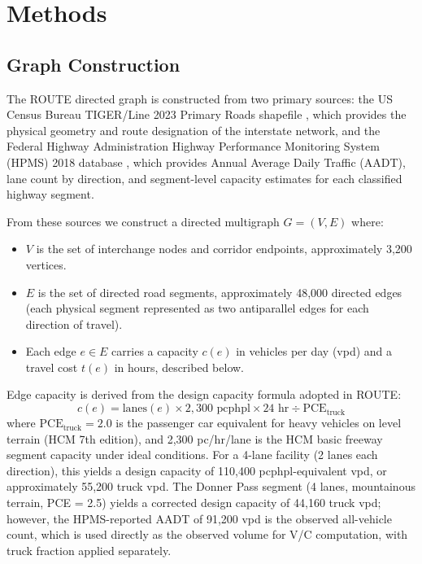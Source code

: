 \section{Methods}
\label{sec:methods}

\subsection{Graph Construction}

The ROUTE directed graph is constructed from two primary sources: the US Census Bureau TIGER/Line 2023 Primary Roads shapefile \citep{TIGER2023}, which provides the physical geometry and route designation of the interstate network, and the Federal Highway Administration Highway Performance Monitoring System (HPMS) 2018 database \citep{HPMS2018}, which provides Annual Average Daily Traffic (AADT), lane count by direction, and segment-level capacity estimates for each classified highway segment.

From these sources we construct a directed multigraph $G = (V, E)$ where:
\begin{itemize}
  \item $V$ is the set of interchange nodes and corridor endpoints, approximately 3,200 vertices.
  \item $E$ is the set of directed road segments, approximately 48,000 directed edges (each physical segment represented as two antiparallel edges for each direction of travel).
  \item Each edge $e \in E$ carries a capacity $c(e)$ in vehicles per day (vpd) and a travel cost $t(e)$ in hours, described below.
\end{itemize}

Edge capacity is derived from the design capacity formula adopted in ROUTE:
\begin{equation}
  c(e) = \text{lanes}(e) \times 2{,}300 \text{ pcphpl} \times 24 \text{ hr} \div \text{PCE}_\text{truck}
\end{equation}
where $\text{PCE}_\text{truck} = 2.0$ is the passenger car equivalent for heavy vehicles on level terrain (HCM 7th edition), and 2,300 pc/hr/lane is the HCM basic freeway segment capacity under ideal conditions. For a 4-lane facility (2 lanes each direction), this yields a design capacity of 110,400 pcphpl-equivalent vpd, or approximately 55,200 truck vpd. The Donner Pass segment (4 lanes, mountainous terrain, PCE = 2.5) yields a corrected design capacity of 44,160 truck vpd; however, the HPMS-reported AADT of 91,200 vpd is the observed all-vehicle count, which is used directly as the observed volume for V/C computation, with truck fraction applied separately.

